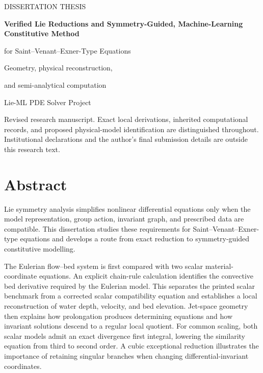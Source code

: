 \documentclass[11pt,a4paper,oneside]{report}
\numberwithin{equation}{chapter}
\begin{document}
\begin{titlepage}
\centering\vspace*{18mm}
{\large DISSERTATION THESIS\par}
\vspace{14mm}
{\LARGE\bfseries Verified Lie Reductions and Symmetry-Guided, Machine-Learning Constitutive Method\par}
\vspace{9mm}
{\Large for Saint--Venant--Exner-Type Equations\par}
\vspace{12mm}
{\large Geometry, physical reconstruction,\par and semi-analytical computation\par}
\vfill
{\large Lie-ML PDE Solver Project\par}
\vspace{4mm}{26 October 2026\par}
\vspace{12mm}
\begin{minipage}{.86\textwidth}\small
Revised research manuscript. Exact local derivations, inherited computational records, and proposed physical-model identification are distinguished throughout. Institutional declarations and the author's final submission details are outside this research text.
\end{minipage}
\end{titlepage}
\chapter*{Abstract}
Lie symmetry analysis simplifies nonlinear differential equations only when the model representation, group action, invariant graph, and prescribed data are compatible. This dissertation studies these requirements for Saint--Venant--Exner-type equations and develops a route from exact reduction to symmetry-guided constitutive modelling.

The Eulerian flow--bed system is first compared with two scalar material-coordinate equations. An explicit chain-rule calculation identifies the convective bed derivative required by the Eulerian model. This separates the printed scalar benchmark from a corrected scalar compatibility equation and establishes a local reconstruction of water depth, velocity, and bed elevation. Jet-space geometry then explains how prolongation produces determining equations and how invariant solutions descend to a regular local quotient. For common scaling, both scalar models admit an exact divergence first integral, lowering the similarity equation from third to second order. A cubic exceptional reduction illustrates the importance of retaining singular branches when changing differential-invariant coordinates.
\end{document}

